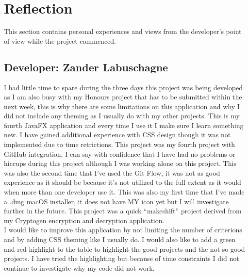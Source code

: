 \documentclass[11pt]{article}
\begin{document}
    \section{Reflection}
		This section contains personal experiences and views from the developer's point of view while the project commenced.\\

		\subsection{Developer: Zander Labuschagne}
			I had little time to spare during the three days this project was being developed as I am also busy with my Honours project that has to be submitted within the next week, this is why there are some limitations on this application and why I did not include any theming as I usually do with my other projects. This is my fourth JavaFX application and every time I use it I make sure I learn something new. I have gained additional experience with CSS design though it was not implemented due to time retrictions. This project was my fourth project with GitHub integration, I can say with confidence that I have had no problems or hiccups during this project although I was working alone on this project. This was also the second time that I've used the Git Flow, it was not as good experience as it should be because it's not utilized to the full extent as it would when more than one developer use it. This was also my first time that I've made a .dmg macOS installer, it does not have MY icon yet but I will investigate further in the future. This project was a quick ``makeshift'' project derived from my Cryptogen encryption and decryption application.\\

			I would like to improve this application by not limiting the number of criterions and by adding CSS theming like I usually do. I would also like to add a green and red highlight to the table to highlight the good projects and the not so good projects. I have tried the highlighting but because of time constraints I did not continue to investigate why my code did not work.

		\newpage
		
		
		\thispagestyle{plain}
		\clearpage
\end{document}
